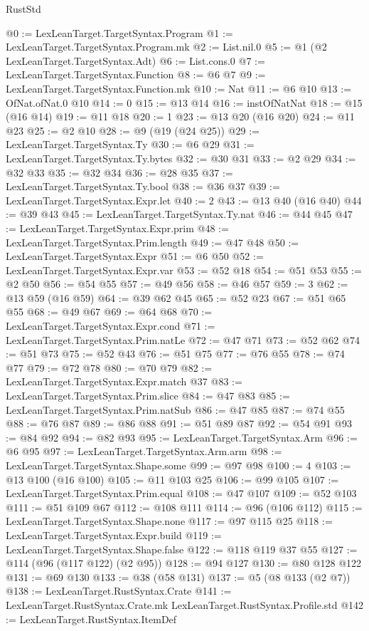 \begin{lexlean}{RustStd}
\begin{coremodule}
{\begin{coremodule}
{{{{{@0 := LexLeanTarget.TargetSyntax.Program
@1 := LexLeanTarget.TargetSyntax.Program.mk
@2 := List.nil.{0}
@5 := @1 (@2 LexLeanTarget.TargetSyntax.Adt)
@6 := List.cons.{0}
@7 := LexLeanTarget.TargetSyntax.Function
@8 := @6 @7
@9 := LexLeanTarget.TargetSyntax.Function.mk
@10 := Nat
@11 := @6 @10
@13 := OfNat.ofNat.{0} @10
@14 := 0
@15 := @13 @14
@16 := instOfNatNat
@18 := @15 (@16 @14)
@19 := @11 @18
@20 := 1
@23 := @13 @20 (@16 @20)
@24 := @11 @23
@25 := @2 @10
@28 := @9 (@19 (@24 @25))
@29 := LexLeanTarget.TargetSyntax.Ty
@30 := @6 @29
@31 := LexLeanTarget.TargetSyntax.Ty.bytes
@32 := @30 @31
@33 := @2 @29
@34 := @32 @33
@35 := @32 @34
@36 := @28 @35
@37 := LexLeanTarget.TargetSyntax.Ty.bool
@38 := @36 @37
@39 := LexLeanTarget.TargetSyntax.Expr.let
@40 := 2
@43 := @13 @40 (@16 @40)
@44 := @39 @43
@45 := LexLeanTarget.TargetSyntax.Ty.nat
@46 := @44 @45
@47 := LexLeanTarget.TargetSyntax.Expr.prim
@48 := LexLeanTarget.TargetSyntax.Prim.length
@49 := @47 @48
@50 := LexLeanTarget.TargetSyntax.Expr
@51 := @6 @50
@52 := LexLeanTarget.TargetSyntax.Expr.var
@53 := @52 @18
@54 := @51 @53
@55 := @2 @50
@56 := @54 @55
@57 := @49 @56
@58 := @46 @57
@59 := 3
@62 := @13 @59 (@16 @59)
@64 := @39 @62 @45
@65 := @52 @23
@67 := @51 @65 @55
@68 := @49 @67
@69 := @64 @68
@70 := LexLeanTarget.TargetSyntax.Expr.cond
@71 := LexLeanTarget.TargetSyntax.Prim.natLe
@72 := @47 @71
@73 := @52 @62
@74 := @51 @73
@75 := @52 @43
@76 := @51 @75
@77 := @76 @55
@78 := @74 @77
@79 := @72 @78
@80 := @70 @79
@82 := LexLeanTarget.TargetSyntax.Expr.match @37
@83 := LexLeanTarget.TargetSyntax.Prim.slice
@84 := @47 @83
@85 := LexLeanTarget.TargetSyntax.Prim.natSub
@86 := @47 @85
@87 := @74 @55
@88 := @76 @87
@89 := @86 @88
@91 := @51 @89 @87
@92 := @54 @91
@93 := @84 @92
@94 := @82 @93
@95 := LexLeanTarget.TargetSyntax.Arm
@96 := @6 @95
@97 := LexLeanTarget.TargetSyntax.Arm.arm
@98 := LexLeanTarget.TargetSyntax.Shape.some
@99 := @97 @98
@100 := 4
@103 := @13 @100 (@16 @100)
@105 := @11 @103 @25
@106 := @99 @105
@107 := LexLeanTarget.TargetSyntax.Prim.equal
@108 := @47 @107
@109 := @52 @103
@111 := @51 @109 @67
@112 := @108 @111
@114 := @96 (@106 @112)
@115 := LexLeanTarget.TargetSyntax.Shape.none
@117 := @97 @115 @25
@118 := LexLeanTarget.TargetSyntax.Expr.build
@119 := LexLeanTarget.TargetSyntax.Shape.false
@122 := @118 @119 @37 @55
@127 := @114 (@96 (@117 @122) (@2 @95))
@128 := @94 @127
@130 := @80 @128 @122
@131 := @69 @130
@133 := @38 (@58 @131)
@137 := @5 (@8 @133 (@2 @7))
@138 := LexLeanTarget.RustSyntax.Crate
@141 := LexLeanTarget.RustSyntax.Crate.mk LexLeanTarget.RustSyntax.Profile.std
@142 := LexLeanTarget.RustSyntax.ItemDef
}}}}}
\end{coremodule}}
\end{coremodule}
\end{lexlean}
